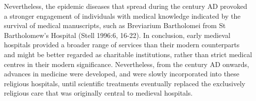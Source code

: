 \documentclass[%
	]{ijsra}
\begin{document}
Nevertheless, the epidemic diseases that spread during the  century AD provoked a stronger engagement of individuals with medical knowledge indicated by the survival of medical manuscripts, such as Breviarium Bartholomei from St Bartholomew’s Hospital (Stell 1996:6, 16-22). 
In conclusion, early medieval hospitals provided a broader range of services than their modern counterparts and might be better regarded as charitable institutions, rather than strict medical centres in their modern significance. Nevertheless, from the  century AD onwards, advances in medicine were developed, and were slowly incorporated into these religious hospitals, until scientific treatments eventually replaced the exclusively religious care that was originally central to medieval hospitals. 

\iffalse
Illustrations
Figure 1. St Leonard’s Hospital plan. Obtained from Dean, 2008: 100, figure 37.
Figure 2. Engraving from 1810 depicting St Bartholomew’s the Great Church, the only surviving element of the original medieval hospital located at the site of the modern St Bartholomew’s Hospital. Artefact ID No.: A19933. ©Museum of London. Retrieved 20 August 2016.
Figure 3. St Mary Spital plan. Obtained from Thomas, 2002: 98, figure 37.
Figure 4. One of the wooden bowls recovered from St Mary Spital. They contained scratched marks and might have been used to feed the sick. Image obtained from Museum of London. Artefact ID No.: NRF88[1286]<611>. ©Museum of London. Retrieved 20 August 2016.
\fi
\IJSRAclosing%
\end{document}
